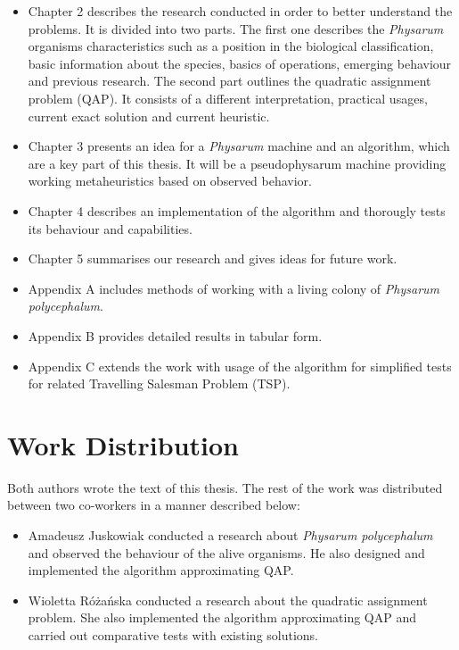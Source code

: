 \documentclass[english,a4paper,twoside]{ppfcmthesis}
\begin{document}
\begin{itemize}
  \item Chapter 2 describes the research conducted in order to better understand the problems. It is divided into two parts. The first one describes the \textit{Physarum} organisms characteristics such as a position in the biological classification, basic information about the species, basics of operations, emerging behaviour and previous research. The second part outlines the quadratic assignment problem (QAP). It consists of a different interpretation, practical usages, current exact solution and current heuristic.
  \item Chapter 3 presents an idea for a \textit{Physarum} machine and an algorithm, which are a key part of this thesis. It will be a pseudophysarum machine providing working metaheuristics based on observed behavior.
  \item Chapter 4 describes an implementation of the algorithm and thorougly tests its behaviour and capabilities.
  \item Chapter 5 summarises our research and gives ideas for future work.
  \item Appendix A includes methods of working with a living colony of \textit{Physarum polycephalum}.
  \item Appendix B provides detailed results in tabular form.
  \item Appendix C extends the work with usage of the algorithm for simplified tests for related Travelling Salesman Problem (TSP).
\end{itemize}

\section*{Work Distribution}
\label{section:introduction_distribution}

Both authors wrote the text of this thesis. The rest of the work was distributed between two co-workers in a manner described below:
\begin{itemize}
  \item Amadeusz Juskowiak conducted a research about \textit{Physarum polycephalum} and observed the behaviour of the alive organisms. He also designed and implemented the algorithm approximating QAP.
  \item Wioletta Różańska conducted a research about the quadratic assignment problem. She also implemented the algorithm approximating QAP and carried out comparative tests with existing solutions.
\end{itemize}
\end{document}
